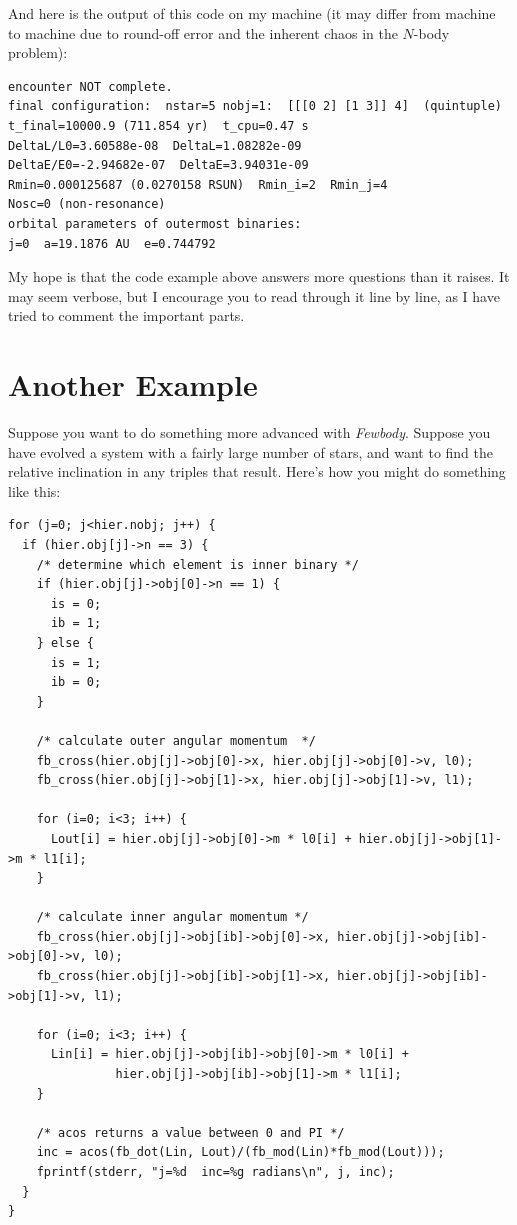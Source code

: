 \documentclass[10pt,preprint]{aastex} %
\newcommand{\Fewbody}{{\em Fewbody\/}}
\begin{document}

And here is the output of this code on my machine (it may differ from machine to machine due
to round-off error and the inherent chaos in the $N$-body problem):

\begin{verbatim}
encounter NOT complete.
final configuration:  nstar=5 nobj=1:  [[[0 2] [1 3]] 4]  (quintuple)
t_final=10000.9 (711.854 yr)  t_cpu=0.47 s
DeltaL/L0=3.60588e-08  DeltaL=1.08282e-09
DeltaE/E0=-2.94682e-07  DeltaE=3.94031e-09
Rmin=0.000125687 (0.0270158 RSUN)  Rmin_i=2  Rmin_j=4
Nosc=0 (non-resonance)
orbital parameters of outermost binaries:
j=0  a=19.1876 AU  e=0.744792
\end{verbatim}

My hope is that the code example above answers more questions than it raises.  It may seem verbose,
but I encourage you to read through it line by line, as I have tried to comment the important
parts.

\section{Another Example}\label{sec:anotherexample}
Suppose you want to do something more advanced with \Fewbody.  Suppose you 
have evolved a system with a fairly large number of stars, and want to find the
relative inclination in any triples that result.  Here's how you might do something
like this:

\begin{verbatim}
for (j=0; j<hier.nobj; j++) {
  if (hier.obj[j]->n == 3) {
    /* determine which element is inner binary */
    if (hier.obj[j]->obj[0]->n == 1) {
      is = 0;
      ib = 1;
    } else {
      is = 1;
      ib = 0;
    }

    /* calculate outer angular momentum  */
    fb_cross(hier.obj[j]->obj[0]->x, hier.obj[j]->obj[0]->v, l0);
    fb_cross(hier.obj[j]->obj[1]->x, hier.obj[j]->obj[1]->v, l1);

    for (i=0; i<3; i++) {
      Lout[i] = hier.obj[j]->obj[0]->m * l0[i] + hier.obj[j]->obj[1]->m * l1[i];
    }

    /* calculate inner angular momentum */
    fb_cross(hier.obj[j]->obj[ib]->obj[0]->x, hier.obj[j]->obj[ib]->obj[0]->v, l0);
    fb_cross(hier.obj[j]->obj[ib]->obj[1]->x, hier.obj[j]->obj[ib]->obj[1]->v, l1);

    for (i=0; i<3; i++) {
      Lin[i] = hier.obj[j]->obj[ib]->obj[0]->m * l0[i] + 
               hier.obj[j]->obj[ib]->obj[1]->m * l1[i];
    }

    /* acos returns a value between 0 and PI */
    inc = acos(fb_dot(Lin, Lout)/(fb_mod(Lin)*fb_mod(Lout)));
    fprintf(stderr, "j=%d  inc=%g radians\n", j, inc);
  }
}
\end{verbatim}
\end{document}
